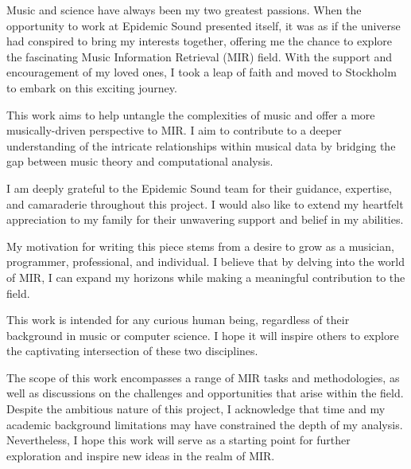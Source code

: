 \begin{preface}

Music and science have always been my two greatest passions. When the opportunity to work at Epidemic Sound presented itself, it was as if the universe had conspired to bring my interests together, offering me the chance to explore the fascinating Music Information Retrieval (MIR) field. With the support and encouragement of my loved ones, I took a leap of faith and moved to Stockholm to embark on this exciting journey.

This work aims to help untangle the complexities of music and offer a more musically-driven perspective to MIR. I aim to contribute to a deeper understanding of the intricate relationships within musical data by bridging the gap between music theory and computational analysis.

I am deeply grateful to the Epidemic Sound team for their guidance, expertise, and camaraderie throughout this project. I would also like to extend my heartfelt appreciation to my family for their unwavering support and belief in my abilities.

My motivation for writing this piece stems from a desire to grow as a musician, programmer, professional, and individual. I believe that by delving into the world of MIR, I can expand my horizons while making a meaningful contribution to the field.

This work is intended for any curious human being, regardless of their background in music or computer science. I hope it will inspire others to explore the captivating intersection of these two disciplines.

The scope of this work encompasses a range of MIR tasks and methodologies, as well as discussions on the challenges and opportunities that arise within the field. Despite the ambitious nature of this project, I acknowledge that time and my academic background limitations may have constrained the depth of my analysis. Nevertheless, I hope this work will serve as a starting point for further exploration and inspire new ideas in the realm of MIR.

\newpage
\end{preface}